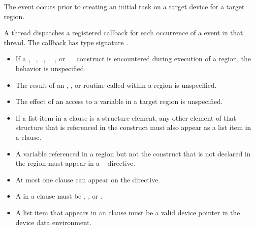 
\events
{}

The  event occurs prior to creating an initial task on a target device for a target
region. 

\tools
{}

A thread dispatches a registered 
callback for each occurrence of a  event
in that thread. The callback has type signature
. 

\restrictions
\begin{itemize}
\item If a , ~, 
~, ~~, or 
~~ construct is encountered during
execution of a  region, the behavior is unspecified.

\item The result of an , 
, or  
routine called within a  region is unspecified.

\item The effect of an access to a  variable in a target region is 
unspecified.

\item If a list item in a  clause is a structure element, any other 
element of that structure that is referenced in the  construct 
must also appear as a list item in a  clause.

\item A variable referenced in a  region but not the  construct that is not 
declared in the  region must appear in a ~ directive. 

\item At most one  clause can appear on the directive.

\item A  in a  clause must be , ,  or .

\item A list item that appears in an  clause must be a valid device pointer in the device data environment.


\end{itemize}
